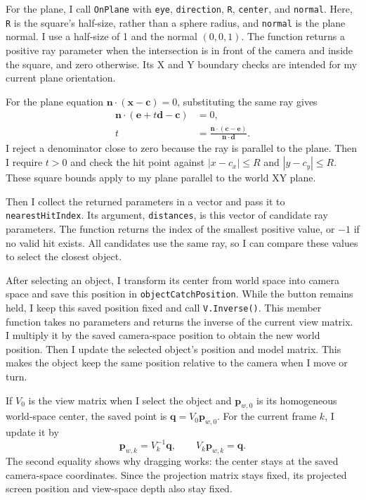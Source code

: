 \documentclass[acmtog]{acmart}
\begin{document}
For the plane, I call \texttt{OnPlane} with \texttt{eye}, \texttt{direction}, \texttt{R}, \texttt{center}, and \texttt{normal}. Here, \texttt{R} is the square's half-size, rather than a sphere radius, and \texttt{normal} is the plane normal. I use a half-size of 1 and the normal $(0,0,1)$. The function returns a positive ray parameter when the intersection is in front of the camera and inside the square, and zero otherwise. Its X and Y boundary checks are intended for my current plane orientation.

For the plane equation $\mathbf n\cdot(\mathbf x-\mathbf c)=0$, substituting the same ray gives
\begin{equation}
\begin{aligned}
\mathbf n\cdot(\mathbf e+t\mathbf d-\mathbf c)&=0,\\
t&=\frac{\mathbf n\cdot(\mathbf c-\mathbf e)}{\mathbf n\cdot\mathbf d}.
\end{aligned}
\end{equation}
I reject a denominator close to zero because the ray is parallel to the plane. Then I require $t>0$ and check the hit point against $|x-c_x|\leq R$ and $|y-c_y|\leq R$. These square bounds apply to my plane parallel to the world XY plane.

Then I collect the returned parameters in a vector and pass it to \texttt{nearestHitIndex}. Its argument, \texttt{distances}, is this vector of candidate ray parameters. The function returns the index of the smallest positive value, or $-1$ if no valid hit exists. All candidates use the same ray, so I can compare these values to select the closest object.

After selecting an object, I transform its center from world space into camera space and save this position in \texttt{objectCatchPosition}. While the button remains held, I keep this saved position fixed and call \texttt{V.Inverse()}. This member function takes no parameters and returns the inverse of the current view matrix. I multiply it by the saved camera-space position to obtain the new world position. Then I update the selected object's position and model matrix. This makes the object keep the same position relative to the camera when I move or turn.

If $V_0$ is the view matrix when I select the object and $\mathbf p_{w,0}$ is its homogeneous world-space center, the saved point is $\mathbf q=V_0\mathbf p_{w,0}$. For the current frame $k$, I update it by
\begin{equation}
\mathbf p_{w,k}=V_k^{-1}\mathbf q,
\qquad V_k\mathbf p_{w,k}=\mathbf q.
\end{equation}
The second equality shows why dragging works: the center stays at the saved camera-space coordinates. Since the projection matrix stays fixed, its projected screen position and view-space depth also stay fixed.
\end{document}
